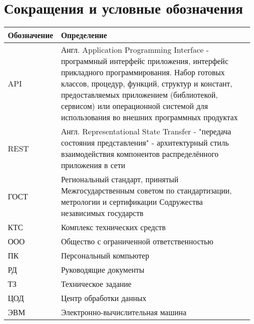\section*{Сокращения и условные обозначения}

\begin{table}[ht]
	\begin{tabular}{|p{5cm}|p{10cm}|}
		\hline
		Обозначение & Определение \\ \hline
		API	& Англ. Application Programming Interface - программный интерфейс приложения, интерфейс прикладного программирования. Набор готовых классов, процедур, функций, структур и констант, предоставляемых приложением (библиотекой, сервисом) или операционной системой для использования во внешних программных продуктах
\\ \hline
		REST	& Англ. Representational State Transfer - "передача состояния представления" - архитектурный стиль взаимодействия компонентов распределённого приложения в сети
\\ \hline
		ГОСТ	& Региональный стандарт, принятый Межгосударственным советом по стандартизации, метрологии и сертификации Содружества независимых государств
\\ \hline
		КТС	& Комплекс технических средств
 \\ \hline
		ООО	& Общество с ограниченной ответственностью
\\ \hline
		ПК	& Персональный компьютер
\\ \hline
		РД	& Руководящие документы
\\ \hline
		ТЗ	& Техническое задание
\\ \hline
		ЦОД	& Центр обработки данных
\\ \hline
		ЭВМ	& Электронно-вычислительная машина
\\ \hline
		
	\end{tabular}

	
\end{table}